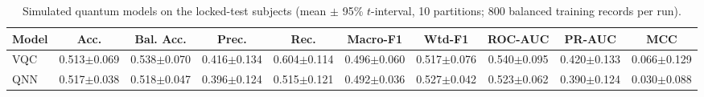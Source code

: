 \begin{table}[!t]\centering\caption{Simulated quantum models on the locked-test subjects (mean $\pm$ 95\% $t$-interval, 10 partitions; 800 balanced training records per run).}\label{tab:quantum}\scriptsize\setlength{\tabcolsep}{3pt}\begin{tabular}{lccccccccc}\toprule
Model & Acc. & Bal. Acc. & Prec. & Rec. & Macro-F1 & Wtd-F1 & ROC-AUC & PR-AUC & MCC\\\midrule
VQC & 0.513$\pm$0.069 & 0.538$\pm$0.070 & 0.416$\pm$0.134 & 0.604$\pm$0.114 & 0.496$\pm$0.060 & 0.517$\pm$0.076 & 0.540$\pm$0.095 & 0.420$\pm$0.133 & 0.066$\pm$0.129\\
QNN & 0.517$\pm$0.038 & 0.518$\pm$0.047 & 0.396$\pm$0.124 & 0.515$\pm$0.121 & 0.492$\pm$0.036 & 0.527$\pm$0.042 & 0.523$\pm$0.062 & 0.390$\pm$0.124 & 0.030$\pm$0.088\\
\bottomrule\end{tabular}\end{table}
